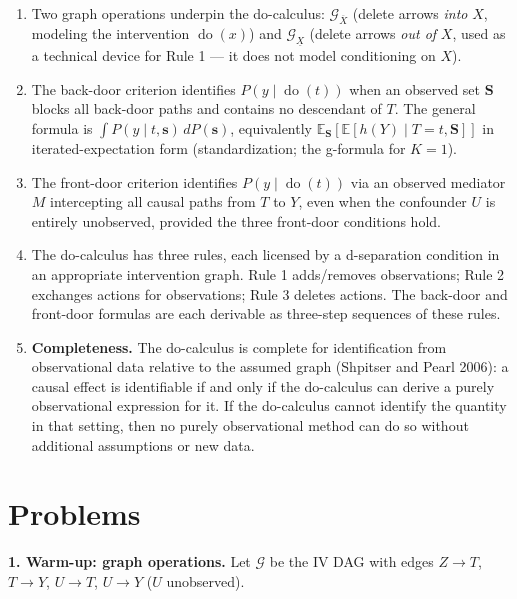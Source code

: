 \documentclass[
  a4paper,
]{book}
\newcommand{\doop}{\operatorname{do}}
\newcommand{\E}{\mathbb{E}}
\newcommand{\Gcal}{\mathcal{G}}
\begin{document}
\begin{enumerate}
\def\labelenumi{\arabic{enumi}.}
\item
  Two graph operations underpin the do-calculus:
  \(\Gcal_{\overline{X}}\) (delete arrows \emph{into} \(X\), modeling
  the intervention \(\doop(x)\)) and \(\Gcal_{\underline{X}}\) (delete
  arrows \emph{out of} \(X\), used as a technical device for Rule 1 ---
  it does not model conditioning on \(X\)).
\item
  The back-door criterion identifies \(P(y \mid \doop(t))\) when an
  observed set \(\mathbf{S}\) blocks all back-door paths and contains no
  descendant of \(T\). The general formula is
  \(\int P(y \mid t, \mathbf{s})\,dP(\mathbf{s})\), equivalently
  \(\E_{\mathbf{S}}\!\left[\E[h(Y)\mid T{=}t,\mathbf{S}]\right]\) in
  iterated-expectation form (standardization; the g-formula for
  \(K=1\)).
\item
  The front-door criterion identifies \(P(y \mid \doop(t))\) via an
  observed mediator \(M\) intercepting all causal paths from \(T\) to
  \(Y\), even when the confounder \(U\) is entirely unobserved, provided
  the three front-door conditions hold.
\item
  The do-calculus has three rules, each licensed by a d-separation
  condition in an appropriate intervention graph. Rule 1 adds/removes
  observations; Rule 2 exchanges actions for observations; Rule 3
  deletes actions. The back-door and front-door formulas are each
  derivable as three-step sequences of these rules.
\item
  \textbf{Completeness.} The do-calculus is complete for identification
  from observational data relative to the assumed graph (Shpitser and
  Pearl 2006): a causal effect is identifiable if and only if the
  do-calculus can derive a purely observational expression for it. If
  the do-calculus cannot identify the quantity in that setting, then no
  purely observational method can do so without additional assumptions
  or new data.
\end{enumerate}

\section{Problems}\label{problems-2}

\textbf{1. Warm-up: graph operations.} Let \(\Gcal\) be the IV DAG with
edges \(Z \to T\), \(T \to Y\), \(U \to T\), \(U \to Y\) (\(U\)
unobserved).
\end{document}
